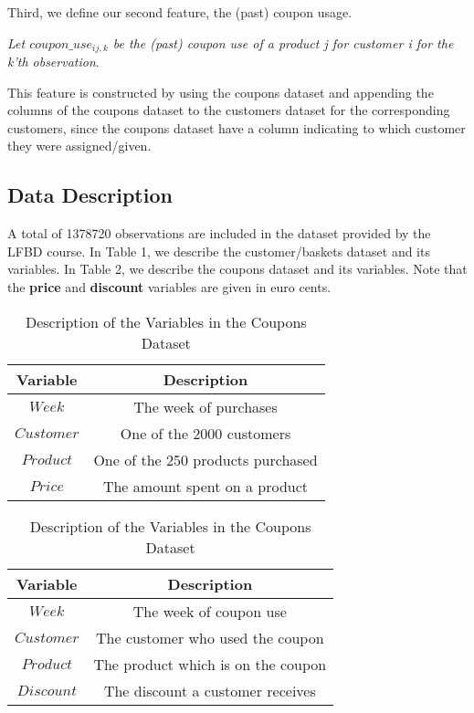 Third, we define our second feature, the (past) coupon usage.

\textit{Let $coupon\_use_{ij,k}$ be the (past) coupon use of a
product j for customer i for the k'th observation}.

This feature is constructed by using the coupons dataset and appending the
columns of the coupons dataset to the customers dataset for the corresponding
customers, since the coupons dataset have a column indicating to which customer
they were assigned/given.

\subsection{Data Description}
A total of 1378720 observations are included in the dataset provided by the LFBD
course. In Table 1, we describe the customer/baskets dataset and its
variables. In Table 2, we describe the coupons dataset and its variables. Note
that the \textbf{price} and \textbf{discount} variables are given in euro cents.

\begin{table}[H]
\parbox{.45\linewidth}{
\centering
\scalebox{0.85}
{
 \begin{tabular}{| c | c |}
    \hline
    Variable & Description \\
    \hline
    $Week$ & The week of purchases \\
    $Customer$ & One of the 2000 customers \\
    $Product$ & One of the 250 products purchased \\
    $Price$ & The amount spent on a product \\
    \hline
    \end{tabular}
}
\caption{Description of the Variables in the Customers/Baskets Dataset}
}
\hfill
\parbox{.45\linewidth}{
\centering
\scalebox{0.85}
{
    \begin{tabular}{| c | c |}
    \hline
    Variable & Description \\
    \hline
    $Week$ & The week of coupon use \\
    $Customer$ & The customer who used the coupon \\
    $Product$ & The product which is on the coupon \\
    $Discount$ & The discount a customer receives \\
    \hline
    \end{tabular}
}
\caption{Description of the Variables in the Coupons Dataset}
}
\end{table}

